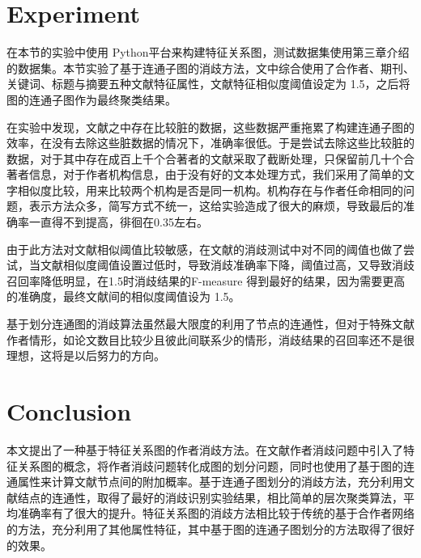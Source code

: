 \documentclass[sigchi]{acmart}
\begin{document}
\section{Experiment}
在本节的实验中使用 Python平台来构建特征关系图，测试数据集使用第三章介绍的数据集。本节实验了基于连通子图的消歧方法，文中综合使用了合作者、期刊、关键词、标题与摘要五种文献特征属性，文献特征相似度阈值设定为 1.5，之后将图的连通子图作为最终聚类结果。

在实验中发现，文献之中存在比较脏的数据，这些数据严重拖累了构建连通子图的效率，在没有去除这些脏数据的情况下，准确率很低。于是尝试去除这些比较脏的数据，对于其中存在成百上千个合著者的文献采取了截断处理，只保留前几十个合著者信息，对于作者机构信息，由于没有好的文本处理方式，我们采用了简单的文字相似度比较，用来比较两个机构是否是同一机构。机构存在与作者任命相同的问题，表示方法众多，简写方式不统一，这给实验造成了很大的麻烦，导致最后的准确率一直得不到提高，徘徊在0.35左右。

由于此方法对文献相似阈值比较敏感，在文献的消歧测试中对不同的阈值也做了尝试，当文献相似度阈值设置过低时，导致消歧准确率下降，阈值过高，又导致消歧召回率降低明显，在1.5时消歧结果的F-measure 得到最好的结果，因为需要更高的准确度，最终文献间的相似度阈值设为 1.5。

基于划分连通图的消歧算法虽然最大限度的利用了节点的连通性，但对于特殊文献作者情形，如论文数目比较少且彼此间联系少的情形，消歧结果的召回率还不是很理想，这将是以后努力的方向。



\section{Conclusion}
本文提出了一种基于特征关系图的作者消歧方法。在文献作者消歧问题中引入了特征关系图的概念，将作者消歧问题转化成图的划分问题，同时也使用了基于图的连通属性来计算文献节点间的附加概率。基于连通子图划分的消歧方法，充分利用文献结点的连通性，取得了最好的消歧识别实验结果，相比简单的层次聚类算法，平均准确率有了很大的提升。特征关系图的消歧方法相比较于传统的基于合作者网络的方法，充分利用了其他属性特征，其中基于图的连通子图划分的方法取得了很好的效果。



\end{document}
